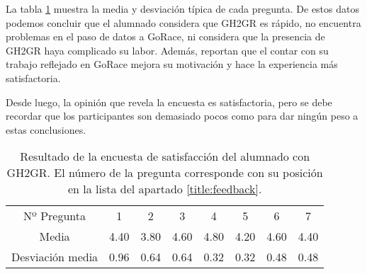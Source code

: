 La tabla \ref{tab:encuesta} muestra la media y desviación típica de cada pregunta. De estos datos podemos concluir que el alumnado considera que GH2GR es rápido, no encuentra problemas en el paso de datos a GoRace, ni considera que la presencia de GH2GR haya complicado su labor. Además, reportan que el contar con su trabajo reflejado en GoRace mejora su motivación y hace la experiencia más satisfactoria.

Desde luego, la opinión que revela la encuesta es satisfactoria, pero se debe recordar que los participantes son demasiado pocos como para dar ningún peso a estas conclusiones.

\begin{table}
    \centering
    \begin{tabular}{cccccccc}
         Nº Pregunta      & 1    & 2    & 3    & 4    & 5    & 6    & 7    \\
        Media            & 4.40 & 3.80 & 4.60 & 4.80 & 4.20 & 4.60 & 4.40 \\
        Desviación media & 0.96 & 0.64 & 0.64 & 0.32 & 0.32 & 0.48 & 0.48
    \end{tabular}
    \caption{Resultado de la encuesta de satisfacción del alumnado con GH2GR. El número de la pregunta corresponde con su posición en la lista del apartado \ref{title:feedback}.}
    \label{tab:encuesta}
\end{table}
